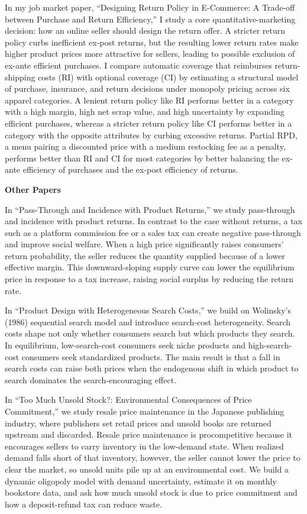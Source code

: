 \documentclass[11pt]{article}
\begin{document}
In my job market paper, ``Designing Return Policy in E-Commerce: A Trade-off between Purchase and Return Efficiency,'' I study a core quantitative-marketing decision: how an online seller should design the return offer. A stricter return policy curbs inefficient ex-post returns, but the resulting lower return rates make higher product prices more attractive for sellers, leading to possible exclusion of ex-ante efficient purchases. I compare automatic coverage that reimburses return-shipping costs (RI) with optional coverage (CI) by estimating a structural model of purchase, insurance, and return decisions under monopoly pricing across six apparel categories. A lenient return policy like RI performs better in a category with a high margin, high net scrap value, and high uncertainty by expanding efficient purchases, whereas a stricter return policy like CI performs better in a category with the opposite attributes by curbing excessive returns. Partial RPD, a menu pairing a discounted price with a medium restocking fee as a penalty, performs better than RI and CI for most categories by better balancing the ex-ante efficiency of purchases and the ex-post efficiency of returns.

\textbf{Other Papers}

In ``Pass-Through and Incidence with Product Returns,'' we study pass-through and incidence with product returns. In contrast to the case without returns, a tax such as a platform commission fee or a sales tax can create negative pass-through and improve social welfare. When a high price significantly raises consumers' return probability, the seller reduces the quantity supplied because of a lower effective margin. This downward-sloping supply curve can lower the equilibrium price in response to a tax increase, raising social surplus by reducing the return rate.

In ``Product Design with Heterogeneous Search Costs,'' we build on Wolinsky's (1986) sequential search model and introduce search-cost heterogeneity. Search costs shape not only whether consumers search but which products they search. In equilibrium, low-search-cost consumers seek niche products and high-search-cost consumers seek standardized products. The main result is that a fall in search costs can raise both prices when the endogenous shift in which product to search dominates the search-encouraging effect.

In ``Too Much Unsold Stock?: Environmental Consequences of Price Commitment,'' we study resale price maintenance in the Japanese publishing industry, where publishers set retail prices and unsold books are returned upstream and discarded. Resale price maintenance is procompetitive because it encourages sellers to carry inventory in the low-demand state. When realized demand falls short of that inventory, however, the seller cannot lower the price to clear the market, so unsold units pile up at an environmental cost. We build a dynamic oligopoly model with demand uncertainty, estimate it on monthly bookstore data, and ask how much unsold stock is due to price commitment and how a deposit-refund tax can reduce waste.
\end{document}
